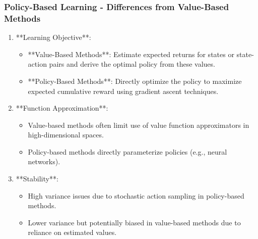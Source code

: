 \documentclass[aspectratio=169]{beamer}
\begin{document}
\begin{frame}[fragile]
    \frametitle{Policy-Based Learning - Differences from Value-Based Methods}
    
    \begin{enumerate}
        \item **Learning Objective**:
            \begin{itemize}
                \item **Value-Based Methods**: Estimate expected returns for states or state-action pairs and derive the optimal policy from these values.
                \item **Policy-Based Methods**: Directly optimize the policy to maximize expected cumulative reward using gradient ascent techniques.
            \end{itemize}
        
        \item **Function Approximation**:
            \begin{itemize}
                \item Value-based methods often limit use of value function approximators in high-dimensional spaces.
                \item Policy-based methods directly parameterize policies (e.g., neural networks).
            \end{itemize}
        
        \item **Stability**:
            \begin{itemize}
                \item High variance issues due to stochastic action sampling in policy-based methods.
                \item Lower variance but potentially biased in value-based methods due to reliance on estimated values.
            \end{itemize}
    \end{enumerate}
\end{frame}
\end{document}
